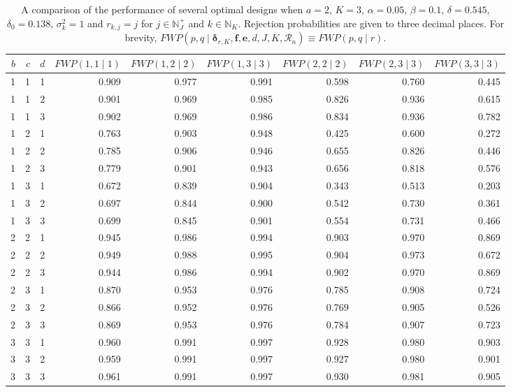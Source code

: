 \documentclass{article}
\numberwithin{equation}{section}
\theoremstyle{plain}
\begin{document}
\def\arraystretch{1.2}
\begin{sidewaystable}[htbp]
	\begin{center}
		\caption{A comparison of the performance of several optimal designs when $a=2$, $K=3$, $\alpha=0.05$, $\beta=0.1$, $\delta=0.545$, $\delta_0=0.138$, $\sigma_k^2=1$ and $r_{k,j}=j$ for $j\in\mathbb{N}_J^+$ and $k\in\mathbb{N}_K$. Rejection probabilities are given to three decimal places. For brevity, $FWP(p,q\mid \boldsymbol{\delta}_{r,K},\boldsymbol{f},\boldsymbol{e},d,J,K,\mathscr{R}_n)\equiv FWP(p,q\mid r)$.}
		\label{taba2}
		\begin{tabular}{rrrrrrrrr}
			\hline
			$b$ & $c$ & $d$ & $FWP(1,1\mid 1)$ & $FWP(1,2\mid 2)$ & $FWP(1,3\mid 3)$ & $FWP(2,2\mid 2)$ & $FWP(2,3\mid 3)$ & $FWP(3,3\mid 3)$ \\
			\hline
			1 & 1 & 1 & 0.909 & 0.977 & 0.991 & 0.598 & 0.760 & 0.445 \\
			1 & 1 & 2 & 0.901 & 0.969 & 0.985 & 0.826 & 0.936 & 0.615 \\
			1 & 1 & 3 & 0.902 & 0.969 & 0.986 & 0.834 & 0.936 & 0.782 \\
			1 & 2 & 1 & 0.763 & 0.903 & 0.948 & 0.425 & 0.600 & 0.272 \\
			1 & 2 & 2 & 0.785 & 0.906 & 0.946 & 0.655 & 0.826 & 0.446 \\
			1 & 2 & 3 & 0.779 & 0.901 & 0.943 & 0.656 & 0.818 & 0.576 \\
			1 & 3 & 1 & 0.672 & 0.839 & 0.904 & 0.343 & 0.513 & 0.203 \\
			1 & 3 & 2 & 0.697 & 0.844 & 0.900 & 0.542 & 0.730 & 0.361 \\
			1 & 3 & 3 & 0.699 & 0.845 & 0.901 & 0.554 & 0.731 & 0.466 \\
			2 & 2 & 1 & 0.945 & 0.986 & 0.994 & 0.903 & 0.970 & 0.869 \\
			2 & 2 & 2 & 0.949 & 0.988 & 0.995 & 0.904 & 0.973 & 0.672 \\
			2 & 2 & 3 & 0.944 & 0.986 & 0.994 & 0.902 & 0.970 & 0.869 \\
			2 & 3 & 1 & 0.870 & 0.953 & 0.976 & 0.785 & 0.908 & 0.724 \\
			2 & 3 & 2 & 0.866 & 0.952 & 0.976 & 0.769 & 0.905 & 0.526 \\
			2 & 3 & 3 & 0.869 & 0.953 & 0.976 & 0.784 & 0.907 & 0.723 \\
			3 & 3 & 1 & 0.960 & 0.991 & 0.997 & 0.928 & 0.980 & 0.903 \\
			3 & 3 & 2 & 0.959 & 0.991 & 0.997 & 0.927 & 0.980 & 0.901 \\
			3 & 3 & 3 & 0.961 & 0.991 & 0.997 & 0.930 & 0.981 & 0.905 \\
			\hline
		\end{tabular}
	\end{center}
\end{sidewaystable}
\end{document}
